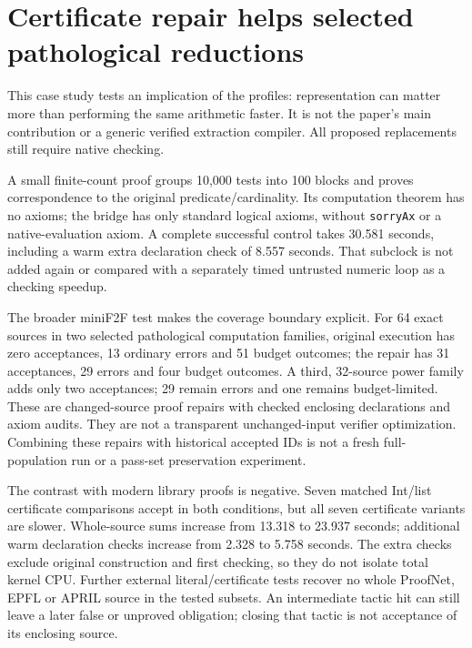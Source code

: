 \documentclass[10pt,twocolumn]{article}
\begin{document}
\section{Certificate repair helps selected pathological reductions}
\label{sec:certificates}
This case study tests an implication of the profiles: representation can
matter more than performing the same arithmetic faster.
It is not the paper's main contribution or a generic verified extraction
compiler. All proposed replacements still require native checking.

A small finite-count proof groups 10,000 tests into 100 blocks and proves
correspondence to the original predicate/cardinality.
Its computation theorem has no axioms; the bridge has only standard logical
axioms, without \texttt{sorryAx} or a native-evaluation axiom.
A complete successful control takes 30.581 seconds, including a warm extra
declaration check of 8.557 seconds.
That subclock is not added again or compared with a separately timed
untrusted numeric loop as a checking speedup.

The broader miniF2F test makes the coverage boundary explicit.
For 64 exact sources in two selected pathological computation families,
original execution has zero acceptances, 13 ordinary errors and 51 budget
outcomes; the repair has 31 acceptances, 29 errors and four budget outcomes.
A third, 32-source power family adds only two acceptances; 29 remain errors
and one remains budget-limited. These are changed-source proof repairs with
checked enclosing declarations and axiom audits.
They are not a transparent unchanged-input verifier optimization.
Combining these repairs with historical accepted IDs is not a fresh
full-population run or a pass-set preservation experiment.

The contrast with modern library proofs is negative.
Seven matched Int/list certificate comparisons accept in both conditions,
but all seven certificate variants are slower.
Whole-source sums increase from 13.318 to 23.937 seconds; additional warm
declaration checks increase from 2.328 to 5.758 seconds.
The extra checks exclude original construction and first checking, so they
do not isolate total kernel CPU.
Further external literal/certificate tests recover no whole ProofNet,
EPFL or APRIL source in the tested subsets.
An intermediate tactic hit can still leave a later false or unproved
obligation; closing that tactic is not acceptance of its enclosing source.
\end{document}
